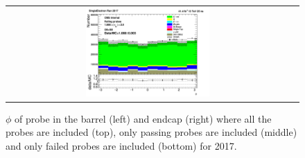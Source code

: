 \begin{figure}[htp]
\begin{center}
\begin{tabular}{cc}
      \includegraphics[width=0.45\textwidth]{figures/Zprime/2017/ScaleFactor/SameSign/nominal/stack_phi_Endcap_fail_PUW.png}
    \end{tabular}
    \caption{$\phi$ of probe in the barrel (left) and endcap (right) where all the probes are included (top), only passing probes are included (middle) and only failed probes are included (bottom) for 2017.}
    \label{fig:SS_nominal_phi_2017}
  \end{center}
\end{figure}
